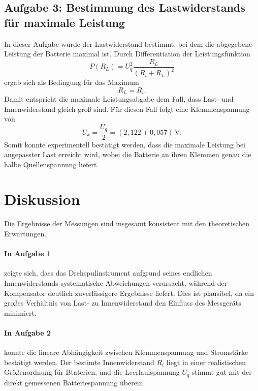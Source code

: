 \subsection*{Aufgabe 3: Bestimmung des Lastwiderstands für maximale Leistung}
In dieser Aufgabe wurde der Lastwiderstand bestimmt, bei dem die abgegebene Leistung der Batterie maximal ist. Durch Differentiation der Leistungsfunktion
\begin{equation}
    P(R_L) = U_q^2 \frac{R_L}{(R_i+R_L)^2}
\label{eq:leistung}
\end{equation}
ergab sich als Bedingung für das Maximum
\begin{equation}
    R_L = R_i.
\end{equation}
Damit entspricht die maximale Leistungsabgabe dem Fall, dass Last- und Innenwiderstand gleich groß sind. Für diesen Fall folgt eine Klemmenspannung von
\begin{equation}
    U_k = \frac{U_q}{2} = (2,122 \pm 0,057)\,\text{V}.
\end{equation}
Somit konnte experimentell bestätigt werden, dass die maximale Leistung bei angepasster Last erreicht wird, wobei die Batterie an ihren Klemmen genau die halbe Quellenspannung liefert.

\section{Diskussion}
Die Ergebnisse der Messungen sind insgesamt konsistent mit den theoretischen Erwartungen. 

\paragraph{In Aufgabe 1} zeigte sich, dass das Drehspulinstrument aufgrund seines endlichen Innenwiderstands systematische Abweichungen verursacht, während der Kompensator deutlich zuverlässigere Ergebnisse liefert. Dies ist plausibel, da ein großes Verhältnis von Last- zu Innenwiderstand den Einfluss des Messgeräts minimiert. 

\paragraph{In Aufgabe 2} konnte die lineare Abhängigkeit zwischen Klemmenspannung und Stromstärke bestätigt werden. Der bestimte Innenwiderstand $R_i$ liegt in einer realistischen Größenordnung für Btaterien, und die Leerlaufspannung $U_q$ stimmt gut mit der direkt gemessenen Batteriespannung überein. 

